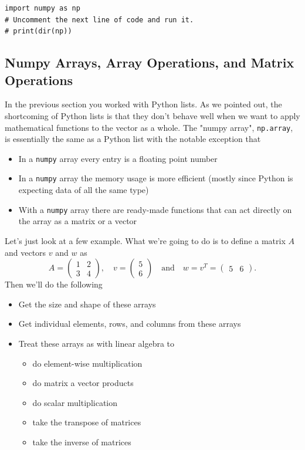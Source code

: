 \bcode
\begin{lstlisting}
import numpy as np
# Uncomment the next line of code and run it.  
# print(dir(np)) 
\end{lstlisting}




\subsection{Numpy Arrays, Array Operations, and Matrix Operations}
In the previous section you worked with Python lists.  As we pointed out, the shortcoming
of Python lists is that they don't behave well when we want to apply mathematical
functions to the vector as a
whole.  The "numpy array", \texttt{np.array}, is essentially the same as a Python list with the
notable exception that

\begin{itemize}
    \item In a \texttt{numpy} array every entry is a floating point number
    \item In a \texttt{numpy} array the memory usage is more efficient (mostly since
        Python is expecting data of all the same type)
    \item With a \texttt{numpy} array there are ready-made functions that can act directly
        on the array as a matrix or a vector
\end{itemize}

Let's just look at a few example.  What we're going to do is to define a matrix $A$ and vectors $v$ and $w$ as
$$A = \begin{pmatrix} 1 & 2 \\ 3 & 4 \end{pmatrix}, \quad v = \begin{pmatrix} 5\\6 \end{pmatrix}
\quad \text{and} \quad w = v^T = \begin{pmatrix} 5 & 6 \end{pmatrix}.$$
Then we'll do the following

\begin{itemize}
    \item Get the size and shape of these arrays
    \item Get individual elements, rows, and columns from these arrays
    \item Treat these arrays as with linear algebra to
        \begin{itemize}
            \item do element-wise multiplication
            \item do matrix a vector products
            \item do scalar multiplication
            \item take the transpose of matrices
            \item take the inverse of matrices
        \end{itemize}
\end{itemize}


